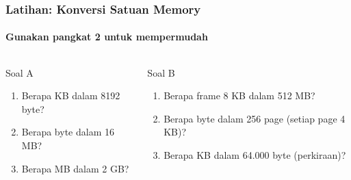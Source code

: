 \documentclass[t,aspectratio=169,xcolor=dvipsnames]{beamer}
\begin{document}
\begin{frame}
    \frametitle{Latihan: Konversi Satuan Memory}
    \framesubtitle{Gunakan pangkat 2 untuk mempermudah}
    \small

    \begin{columns}[T]
        \begin{block}{Soal A}
            \begin{enumerate}
                \item Berapa KB dalam 8192 byte?
                \item Berapa byte dalam 16 MB?
                \item Berapa MB dalam 2 GB?
            \end{enumerate}
        \end{block}

        \begin{block}{Soal B}
            \begin{enumerate}
                \item Berapa frame 8 KB dalam 512 MB?
                \item Berapa byte dalam 256 page (setiap page 4 KB)?
                \item Berapa KB dalam 64.000 byte (perkiraan)?
            \end{enumerate}
        \end{block}
    \end{columns}
\end{frame}
\end{document}
